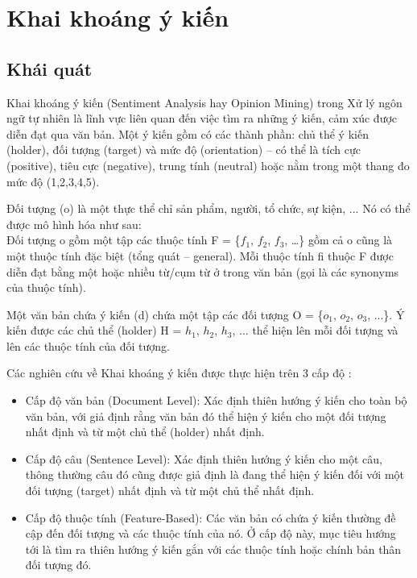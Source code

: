 \documentclass[12pt]{report}
\begin{document}
		\section{Khai khoáng ý kiến}
			\subsection*{Khái quát}
				\par Khai khoáng ý kiến (Sentiment Analysis hay Opinion Mining) trong Xử lý ngôn ngữ tự nhiên là lĩnh vực liên quan đến việc tìm ra những ý kiến, cảm xúc được diễn đạt qua văn bản. Một ý kiến gồm có các thành phần: chủ thể ý kiến (holder), đối tượng (target) và mức độ (orientation) – có thể là tích cực (positive), tiêu cực (negative), trung tính (neutral) hoặc nằm trong một thang đo mức độ (1,2,3,4,5).
				\par Đối tượng (o) là một thực thể chỉ sản phẩm, người, tổ chức, sự kiện, ... Nó có thể được mô hình hóa như sau:\\				
				Đối tượng o gồm một tập các thuộc tính F = \{$f_1$, $f_2$, $f_3$, …\} gồm cả o cũng là một thuộc tính đặc biệt (tổng quát – general). Mỗi thuộc tính fi thuộc F được diễn đạt bằng một hoặc nhiều từ/cụm từ ở trong văn bản (gọi là các synonyms của thuộc tính).
				\par Một văn bản chứa ý kiến (d) chứa một tập các đối tượng O = \{$o_1$, $o_2$, $o_3$, ...\}. Ý kiến được các chủ thể (holder) H = {$h_1$, $h_2$, $h_3$, ...} thể hiện lên mỗi đối tượng và lên các thuộc tính của đối tượng. 
				\par Các nghiên cứu về Khai khoáng ý kiến được thực hiện trên 3 cấp độ \cite{sentiment}:
				\begin{itemize}
					\item{Cấp độ văn bản (Document Level): Xác định thiên hướng ý kiến cho toàn bộ văn bản, với giả định rằng văn bản đó thể hiện ý kiến cho một đối tượng nhất định và từ một chủ thể (holder) nhất định.}		
					\item{Cấp độ câu (Sentence Level): Xác định thiên hướng ý kiến cho một câu, thông thường câu đó cũng được giả định là đang thể hiện ý kiến đối với một đối tượng (target) nhất định và từ một chủ thể nhất định.}
					\item{Cấp độ thuộc tính (Feature-Based): Các văn bản có chứa ý kiến thường đề cập đến đối tượng và các thuộc tính của nó. Ở cấp độ này, mục tiêu hướng tới là tìm ra thiên hướng ý kiến gắn với các thuộc tính hoặc chính bản thân đối tượng đó.}
				\end{itemize}				
\end{document}
